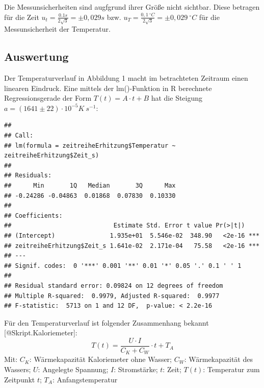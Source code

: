 \documentclass[class=article, crop=false]{standalone}
\newenvironment{Shaded}{\begin{snugshade}}{\end{snugshade}}
\newcommand{\CommentTok}[1]{\textcolor[rgb]{0.56,0.35,0.01}{\textit{#1}}}
\newcommand{\FunctionTok}[1]{\textcolor[rgb]{0.00,0.00,0.00}{#1}}
\newcommand{\NormalTok}[1]{#1}
\newcommand{\OtherTok}[1]{\textcolor[rgb]{0.56,0.35,0.01}{#1}}
\newcommand{\SpecialCharTok}[1]{\textcolor[rgb]{0.00,0.00,0.00}{#1}}
\begin{document}
Die Messunsicherheiten sind augfgrund ihrer Größe nicht sichtbar. Diese
betragen für die Zeit \(u_t = \frac{0.1s}{2\sqrt{3}}=\pm0,029s\) bzw.
\(u_T = \frac{0,1\ ^{\circ}C}{2\sqrt{3}}=\pm0,029\ ^{\circ}C\) für die
Messunsicherheit der Temperatur.

\hypertarget{auswertung}{%
\subsection{Auswertung}\label{auswertung}}

Der Temperaturverlauf in Abbildung 1 macht im betrachteten Zeitraum
einen linearen Eindruck. Eine mittels der lm()-Funktion in R berechnete
Regressionsgerade der Form \(T(t)=A\cdot t+B\) hat die Steigung
\(a=(1641\pm 22)\cdot 10^{-5}K\ s^{-1}\):

\begin{Shaded}
\end{Shaded}

\begin{verbatim}
## 
## Call:
## lm(formula = zeitreiheErhitzung$Temperatur ~ zeitreiheErhitzung$Zeit_s)
## 
## Residuals:
##      Min       1Q   Median       3Q      Max 
## -0.24286 -0.04863  0.01868  0.07830  0.10330 
## 
## Coefficients:
##                            Estimate Std. Error t value Pr(>|t|)    
## (Intercept)               1.935e+01  5.546e-02  348.90   <2e-16 ***
## zeitreiheErhitzung$Zeit_s 1.641e-02  2.171e-04   75.58   <2e-16 ***
## ---
## Signif. codes:  0 '***' 0.001 '**' 0.01 '*' 0.05 '.' 0.1 ' ' 1
## 
## Residual standard error: 0.09824 on 12 degrees of freedom
## Multiple R-squared:  0.9979, Adjusted R-squared:  0.9977 
## F-statistic:  5713 on 1 and 12 DF,  p-value: < 2.2e-16
\end{verbatim}

Für den Temperaturverlauf ist folgender Zusammenhang bekannt
{[}@Skript.Kaloriemeter{]}:
\[T(t) = \frac{U\cdot I}{C_K + C_W}\cdot t + T_A\] Mit: \(C_K\):
Wärmekapazität Kaloriemeter ohne Wasser; \(C_W\): Wärmekapazität des
Wassers; \(U\): Angelegte Spannung; \(I\): Stromstärke; \(t\): Zeit;
\(T(t)\): Temperatur zum Zeitpunkt \(t\); \(T_A\): Anfangstemperatur
\end{document}
